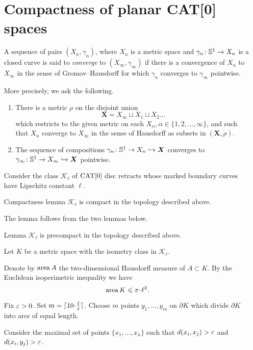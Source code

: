 \section{Compactness of planar CAT[0] spaces}\label{Compactness}

A sequence of pairs $(X_n,\gamma_n)$, where $X_n$ is a metric space and $\gamma_n\colon\mathbb{S}^1\to X_n$ is a 
closed curve is said to \emph{converge} to $(X_\infty,\gamma_\infty)$ if there is a convergence of $X_n$ to $X_\infty$ 
in the sense of Gromov--Hausdorff for which $\gamma_n$ converges to $\gamma_\infty$ pointwise.

More precisely, we ask the following.
\begin{enumerate}[(1)]
	\item There is a metric $\rho$ on the disjoint union 
\[\bm{X}=X_\infty\sqcup X_1\sqcup X_2\dots\]
which restricts to the given metric on each $X_\alpha, \alpha\in\{1,2,\dots,\infty\}$, 
and such that $X_n$ converge to $X_\infty$ in the sense of Hausdorff as subsets in $(\bm{X},\rho)$.
\item  The sequence of compositions $\gamma_n\colon\mathbb{S}^1\to X_n \hookrightarrow\bm{X}$ 
converges to $\gamma_\infty\:\SS^1\zz\to X_\infty \hookrightarrow\bm{X}$ pointwise.
\end{enumerate}
Consider the class $\mathcal{K}_\ell$ of $\mathop{\rm CAT}\nolimits[0]$ disc retracts whose marked
boundary curves have Lipschitz constant $\ell$.


\begin{thm}{Compactness lemma}\label{lem:compact}
$\mathcal{K}_\ell$ is compact in the topology described above.
\end{thm}

The lemma follows from the two lemmas below.

\begin{thm}{Lemma}\label{lem:precompact}
$\mathcal{K}_\ell$ is precompact in the topology described above.
\end{thm}

Let $K$ be a metric space with the isometry class in $\mathcal {K}_\ell$.

Denote by $\mathop{\rm area}\nolimits A$ the two-dimensional Hausdorff measure of $A\subset K$.
By the Euclidean isoperimetric inequality we have 
\[\area K \le \pi\cdot\ell^2.\]

Fix $\varepsilon>0$. 
Set $m=\lceil 10\cdot\tfrac\ell\eps\rceil$.
Choose $m$ points $y_1,\dots,y_m$ on $\partial K$
which divide $\partial K$ into arcs of equal length.

Consider the maximal set of points $\{x_1,\dots,x_n\}$ such that $d(x_i,x_j)>\varepsilon$ and $d(x_i,y_j)>\varepsilon$.


